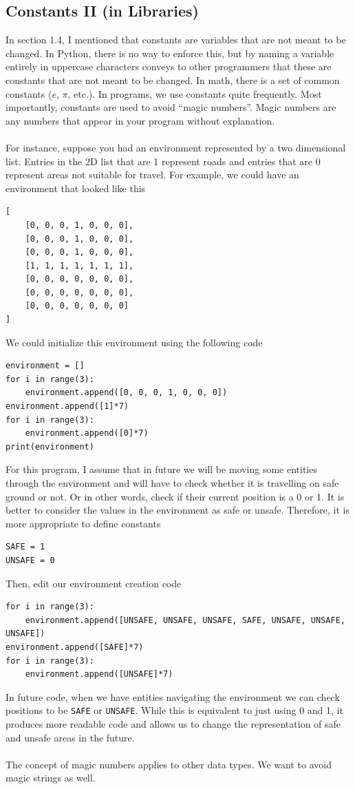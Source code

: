 \documentclass{article}
\begin{document}
\subsection{Constants II (in Libraries)}
In section 1.4, I mentioned that constants are variables that are not meant to be changed. In Python, there is no way to enforce this, but by naming a variable entirely in uppercase characters conveys to other programmers that these are constants that are not meant to be changed. In math, there is a set of common constants ($e$, $\pi$, etc.). In programs, we use constants quite frequently. Most importantly, constants are used to avoid ``magic numbers''. Magic numbers are any numbers that appear in your program without explanation.\\\\
For instance, suppose you had an environment represented by a two dimensional list. Entries in the 2D list that are 1 represent roads and entries that are 0 represent areas not suitable for travel. For example, we could have an environment that looked like this
\begin{verbatim}
[
    [0, 0, 0, 1, 0, 0, 0], 
    [0, 0, 0, 1, 0, 0, 0], 
    [0, 0, 0, 1, 0, 0, 0], 
    [1, 1, 1, 1, 1, 1, 1], 
    [0, 0, 0, 0, 0, 0, 0], 
    [0, 0, 0, 0, 0, 0, 0], 
    [0, 0, 0, 0, 0, 0, 0]
]
\end{verbatim}
We could initialize this environment using the following code
\begin{verbatim}
environment = []
for i in range(3):
    environment.append([0, 0, 0, 1, 0, 0, 0])
environment.append([1]*7)
for i in range(3):
    environment.append([0]*7)
print(environment)
\end{verbatim}
For this program, I assume that in future we will be moving some entities through the environment and will have to check whether it is travelling on safe ground or not. Or in other words, check if their current position is a 0 or 1. It is better to consider the values in the environment as safe or unsafe. Therefore, it is more appropriate to define constants
\begin{verbatim}
SAFE = 1
UNSAFE = 0
\end{verbatim}
Then, edit our environment creation code
\begin{verbatim}
for i in range(3):
    environment.append([UNSAFE, UNSAFE, UNSAFE, SAFE, UNSAFE, UNSAFE, UNSAFE])
environment.append([SAFE]*7)
for i in range(3):
    environment.append([UNSAFE]*7)
\end{verbatim}
In future code, when we have entities navigating the environment we can check positions to be \texttt{SAFE} or \texttt{UNSAFE}. While this is equivalent to just using 0 and 1, it produces more readable code and allows us to change the representation of safe and unsafe areas in the future.\\\\
The concept of magic numbers applies to other data types. We want to avoid magic strings as well.
\end{document}
